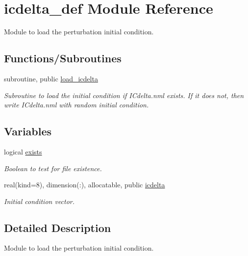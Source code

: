 \hypertarget{namespaceicdelta__def}{}\section{icdelta\+\_\+def Module Reference}
\label{namespaceicdelta__def}


Module to load the perturbation initial condition.  


\subsection*{Functions/\+Subroutines}
\begin{DoxyCompactItemize}
\item 
subroutine, public \hyperlink{namespaceicdelta__def_a7be926b74337687f36be5d971a4e02a2}{load\+\_\+icdelta}
\begin{DoxyCompactList}\small\item\em Subroutine to load the initial condition if I\+Cdelta.\+nml exists. If it does not, then write I\+Cdelta.\+nml with random initial condition. \end{DoxyCompactList}\end{DoxyCompactItemize}
\subsection*{Variables}
\begin{DoxyCompactItemize}
\item 
logical \hyperlink{namespaceicdelta__def_a3d6fe1a548a46a14b09fd3313b9e3546}{exists}
\begin{DoxyCompactList}\small\item\em Boolean to test for file existence. \end{DoxyCompactList}\item 
real(kind=8), dimension(\+:), allocatable, public \hyperlink{namespaceicdelta__def_a1ced9e0fa24222e5dc2f79996864b7da}{icdelta}
\begin{DoxyCompactList}\small\item\em Initial condition vector. \end{DoxyCompactList}\end{DoxyCompactItemize}


\subsection{Detailed Description}
Module to load the perturbation initial condition. 

